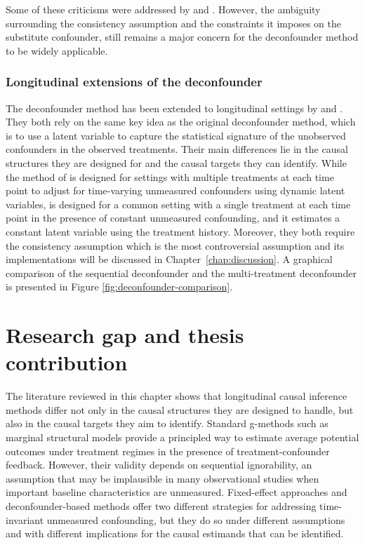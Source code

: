 Some of these criticisms were addressed by  
and . However, the ambiguity surrounding the consistency 
assumption and the constraints it imposes on the substitute confounder, still remains 
a major concern for the deconfounder method to be widely applicable. 

\subsubsection{Longitudinal extensions of the deconfounder}
The deconfounder method has been extended to longitudinal settings 
by  and . 
They both rely on the 
same key idea as the original deconfounder method, which is to use a 
latent variable to capture the statistical signature of the unobserved 
confounders in the observed treatments. Their main differences lie in the causal structures they are designed for 
and the causal targets they can identify.
While the method of  is designed
for settings with multiple treatments 
at each time point to adjust for time-varying unmeasured confounders using dynamic 
latent variables, 
 is designed for a common setting 
with a single treatment at each time point in the presence of constant 
unmeasured confounding, and it estimates a constant latent variable using 
the treatment history. Moreover, they both require the consistency assumption which 
is the most controversial assumption and its implementations will 
be discussed in Chapter~\ref{chap:discussion}. A graphical comparison of 
the sequential deconfounder and the multi-treatment deconfounder is presented in Figure 
\ref{fig:deconfounder-comparison}.

\section{Research gap and thesis contribution}

The literature reviewed in this chapter shows that longitudinal causal inference methods differ not only in the causal structures 
they are designed to handle, but also in the causal targets they aim to identify. Standard g-methods such as marginal structural 
models provide a principled way to estimate average potential outcomes under treatment regimes in the presence of treatment-confounder 
feedback. However, their validity depends on sequential ignorability, an assumption that may be implausible in many observational studies 
when important baseline characteristics are unmeasured. Fixed-effect approaches and deconfounder-based methods offer two different strategies 
for addressing time-invariant unmeasured confounding, but they do so under different assumptions and with different implications for the causal 
estimands that can be identified.


